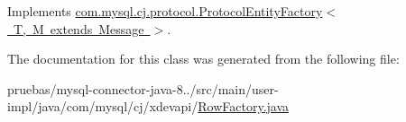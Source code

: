 Implements \mbox{\hyperlink{interfacecom_1_1mysql_1_1cj_1_1protocol_1_1_protocol_entity_factory_a282b14fecc86c7202cd9361333235ef8}{com.\+mysql.\+cj.\+protocol.\+Protocol\+Entity\+Factory$<$ T, M extends Message $>$}}.



The documentation for this class was generated from the following file\+:\begin{DoxyCompactItemize}
\item 
pruebas/mysql-\/connector-\/java-\/8../src/main/user-\/impl/java/com/mysql/cj/xdevapi/\mbox{\hyperlink{_row_factory_8java}{Row\+Factory.\+java}}\end{DoxyCompactItemize}
